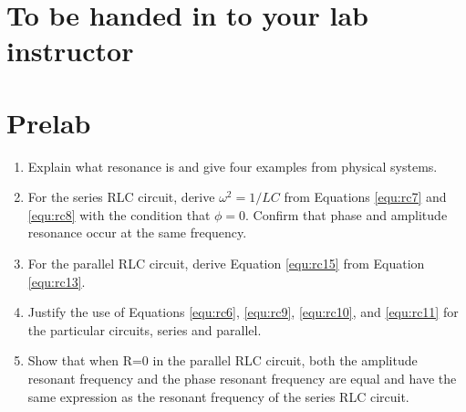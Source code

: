 \section{To be handed in to your lab instructor}

\section{Prelab}
\begin{enumerate}

\item Explain what resonance is and give four examples from physical systems.

\item For the series RLC circuit, derive $\omega^2 = 1/LC$ from Equations \ref{equ:rc7} and \ref{equ:rc8} with the condition that $\phi = 0$. Confirm that phase and amplitude resonance occur at the same frequency.

\item For the parallel RLC circuit, derive Equation \ref{equ:rc15} from Equation \ref{equ:rc13}.

\item Justify the use of Equations \ref{equ:rc6}, \ref{equ:rc9}, \ref{equ:rc10}, and \ref{equ:rc11} for the particular circuits, series and parallel.

\item Show that when R=0 in the parallel RLC circuit, both the amplitude resonant frequency and the phase resonant frequency are equal and have the same expression as the resonant frequency of the series RLC circuit.
\end{enumerate}

